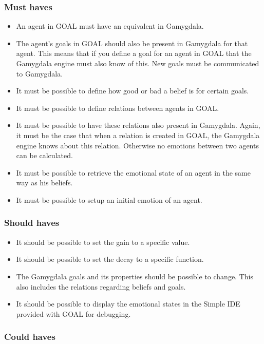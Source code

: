 \documentclass[]{article}
\begin{document}
\subsubsection*{Must haves}
\begin{itemize}
	\item An \gls{agent} in GOAL must have an equivalent in Gamygdala.
	\item The agent's goals in GOAL should also be present in Gamygdala for that agent. This means that if you define a goal for an agent in GOAL that the Gamygdala engine must also know of this. New goals must be communicated to Gamygdala.
	\item It must be possible to define how good or bad a belief is for certain goals.
	\item It must be possible to define relations between agents in GOAL.
	\item It must be possible to have these relations also present in Gamygdala. Again, it must be the case that when a relation is created in GOAL, the Gamygdala engine knows about this relation. Otherwise no emotions between two agents can be calculated.
	\item It must be possible to retrieve the emotional state of an agent in the same way as his beliefs.
	\item It must be possible to setup an initial emotion of an agent.
\end{itemize}
 
\subsubsection*{Should haves}

\begin{itemize}
	\item It should be possible to set the gain to a specific value.
	\item It should be possible to set the decay to a specific function.
	\item The  Gamygdala goals and its properties should be possible to change. This also includes the relations regarding beliefs and goals.
	\item It should be possible to display the emotional states in the Simple IDE\cite{SimpleIDE} provided with GOAL for debugging.
\end{itemize}


\subsubsection*{Could haves}
\end{document}
